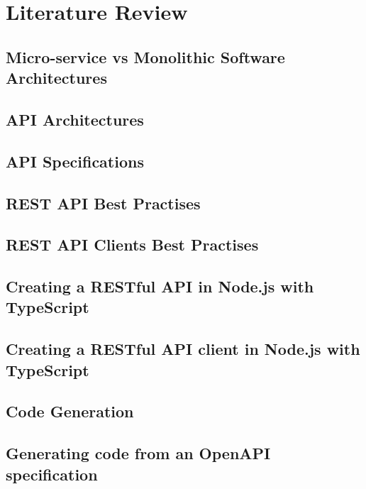 \chapter{Literature Review}
\section{Micro-service vs Monolithic Software Architectures}
\section{API Architectures}
\section{API Specifications}
\section{REST API Best Practises}
\section{REST API Clients Best Practises}
\section{Creating a RESTful API in Node.js with TypeScript}
\section{Creating a RESTful API client in Node.js with TypeScript}
\section{Code Generation}
\section{Generating code from an OpenAPI specification}
